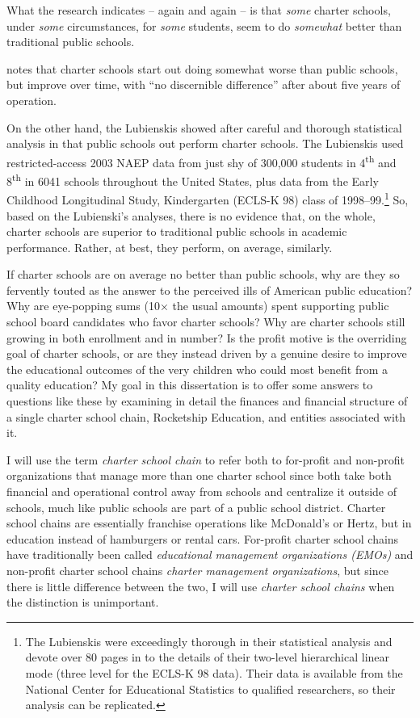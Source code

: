 What the research indicates – again and again – is that \textit{some} charter schools, under \textit{some} circumstances, for \textit{some} students, seem to do \textit{somewhat} better than traditional public schools.\citeauthor{Garcia2018}
\begin{comment}
  [p.119]{Garcia2018}
\end{comment}
notes that charter schools start out doing somewhat worse than public schools, but improve over time, with ``no discernible difference'' \parencite[119]{Garcia2018} after about five years of operation.

On the other hand, the Lubienskis showed after careful and thorough statistical analysis in \parencite{Lubienski.Lubienski2014} that public schools out perform charter schools. The Lubienskis used restricted-access 2003 NAEP data from just shy of 300,000 students in 4\textsuperscript{th} and 8\textsuperscript{th} in 6041 schools throughout the United States, plus data from the Early Childhood Longitudinal Study, Kindergarten (ECLS-K 98) class of 1998–99.\footnote{The Lubienskis were exceedingly thorough in their statistical analysis and devote over 80 pages in \textcite{Lubienski.Lubienski2014} to the details of their two-level hierarchical linear mode (three level for the ECLS-K 98 data). Their data is available from the National Center for Educational Statistics to qualified researchers, so their analysis can be replicated.} So, based on the Lubienski’s analyses, there is no evidence that, on the whole, charter schools are superior to traditional public schools in academic performance. Rather, at best, they perform, on average, similarly.

If charter schools are on average no better than public schools, why are they so fervently touted as the answer to the perceived ills of American public education? Why are eye-popping sums (10× the usual amounts) spent supporting public school board candidates who favor charter schools? Why are charter schools still growing in both enrollment and in number? Is the profit motive is the overriding goal of charter schools, or are they instead driven by a genuine desire to improve the educational outcomes of the very children who could most benefit from a quality education? My goal in this dissertation is to offer some answers to questions like these by examining in detail the finances and financial structure of a single charter school chain, Rocketship Education, and entities associated with it.

I will use the term \textit{charter school chain} to refer both to for-profit and non-profit organizations that manage more than one charter school since both take both financial and operational control away from schools and centralize it outside of schools, much like public schools are part of a public school district.  Charter school chains are essentially franchise operations like McDonald's or Hertz, but in education instead of hamburgers or rental cars. For-profit charter school chains have traditionally been called \textit{educational management organizations (EMOs)} and non-profit charter school chains \textit{charter management organizations}, but since there is little difference between the two, I will use \textit{charter school chains} when the distinction is unimportant.

